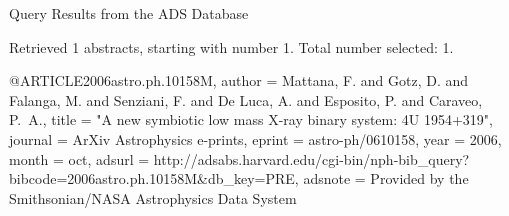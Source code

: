 Query Results from the ADS Database


Retrieved 1 abstracts, starting with number 1.  Total number selected: 1.

@ARTICLE{2006astro.ph.10158M,
   author = {{Mattana}, F. and {Gotz}, D. and {Falanga}, M. and {Senziani}, F. and 
	{De Luca}, A. and {Esposito}, P. and {Caraveo}, P.~A.},
    title = "{A new symbiotic low mass X-ray binary system: 4U 1954+319}",
  journal = {ArXiv Astrophysics e-prints},
   eprint = {astro-ph/0610158},
     year = 2006,
    month = oct,
   adsurl = {http://adsabs.harvard.edu/cgi-bin/nph-bib_query?bibcode=2006astro.ph.10158M&db_key=PRE},
  adsnote = {Provided by the Smithsonian/NASA Astrophysics Data System}
}


